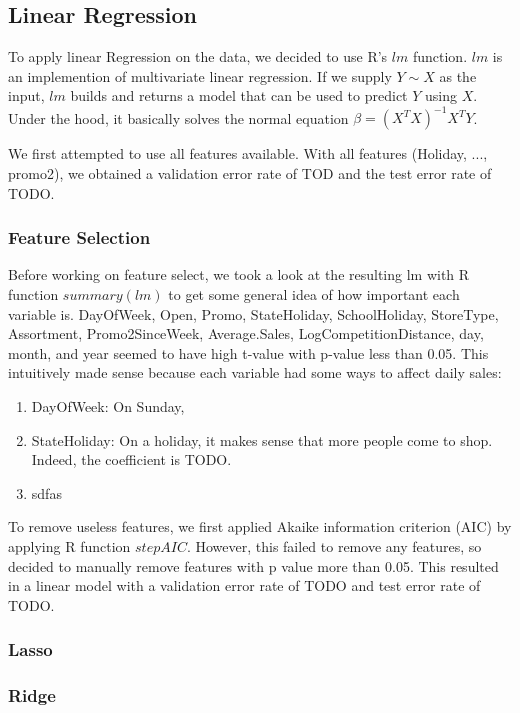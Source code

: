 \documentclass[letterpaper,twocolumn,10pt]{article}
\begin{document}
\subsection{Linear Regression}
To apply linear Regression on the data, we decided to use R's $lm$ function. $lm$ is an implemention of multivariate linear regression. If we supply $Y \sim X$ as the input, $lm$ builds and returns a model that can be used to predict $Y$ using $X$. Under the hood, it basically solves the normal equation $\beta = (X^T X)^{-1} X^T Y$.

We first attempted to use all features available. With all features (Holiday, ..., promo2), we obtained a validation error rate of TOD and the test error rate of TODO.

\subsubsection{Feature Selection}
Before working on feature select, we took a look at the resulting lm with R function $summary(lm)$ to get some general idea of how important each variable is. DayOfWeek, Open, Promo, StateHoliday, SchoolHoliday, StoreType, Assortment, Promo2SinceWeek, Average.Sales, LogCompetitionDistance, day, month, and year seemed to have high t-value with p-value less than 0.05. This intuitively made sense because each variable had some ways to affect daily sales:
\begin{enumerate}
\item DayOfWeek: On Sunday, 
\item StateHoliday: On a holiday, it makes sense that more people come to shop. Indeed, the coefficient is TODO.
\item sdfas
\end{enumerate}

To remove useless features, we first applied Akaike information criterion (AIC) by applying R function $stepAIC$. However, this failed to remove any features, so decided to manually remove features with p value more than 0.05. This resulted in a linear model with a validation error rate of TODO and test error rate of TODO.

\subsubsection{Lasso}

\subsubsection{Ridge}
\end{document}
